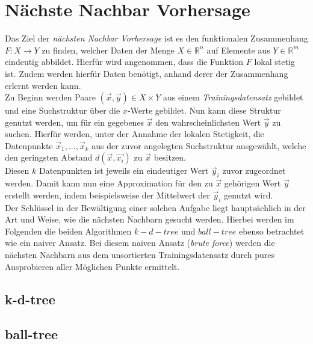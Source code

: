 \section{Nächste Nachbar Vorhersage}
Das Ziel der \textit{nächsten Nachbar Vorhersage} ist es den funktionalen Zusammenhang $F : X \rightarrow Y$ zu finden, welcher Daten der Menge $X \in \mathbb{R}^n$ auf Elemente aus $Y \in \mathbb{R}^m$ eindeutig abbildet. Hierfür wird angenommen, dass die Funktion $F$ lokal stetig ist. Zudem werden hierfür Daten benötigt, anhand derer der Zusammenhang erlernt werden kann.\\
Zu Beginn werden Paare $(\vec{x},\vec{y}) \in X \times Y$ aus einem \textit{Trainingsdatensatz} gebildet und eine Suchstruktur über die $x$-Werte gebildet. Nun kann diese Struktur genutzt werden, um für ein gegebenes $\vec{x}$ den wahrscheinlichsten Wert $\vec{y}$ zu suchen. Hierfür werden, unter der Annahme der lokalen Stetigkeit, die Datenpunkte $\vec{x}_1, ..., \vec{x}_k$ aus der zuvor angelegten Suchstruktur ausgewählt, welche den geringsten Abstand $d(\vec{x}, \vec{x_i})$ zu $\vec{x}$ besitzen.\\
Diesen $k$ Datenpunkten ist jeweils ein eindeutiger Wert $\vec{y}_i$ zuvor zugeordnet werden. Damit kann nun eine Approximation für den zu $\vec{x}$ gehörigen Wert $\vec{y}$ erstellt werden, indem beispielsweise der Mittelwert der $\vec{y}_i$ genutzt wird.\\

Der Schlüssel in der Bewältigung einer solchen Aufgabe liegt hauptsächlich in der Art und Weise, wie die nächsten Nachbarn gesucht werden. Hierbei werden im Folgenden die beiden Algorithmen $k-d-tree$ und $ball-tree$ ebenso betrachtet wie ein naiver Ansatz. Bei diesem naiven Ansatz (\textit{brute force}) werden die nächsten Nachbarn aus dem unsortierten Trainingsdatensatz durch pures Ausprobieren aller Möglichen Punkte ermittelt.

\subsection{k-d-tree}

\subsection{ball-tree}